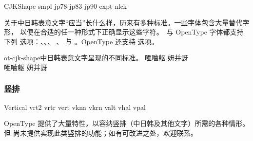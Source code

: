 \documentclass[a4paper]{l3doc}
\begin{document}
\begin{features}{CJKShape}
 {smpl}
    {jp78}
    {jp83}
    {jp90}
     {expt}
        {nlck}
\end{features}

关于中日韩表意文字“应当”长什么样，历来有多种标准。一些字体包含大量替代字形，
以便在合适的任一种形式下正确显示这些字符。\AAT\ 与 OpenType 字体都支持下列
 选项：、、、
、 与 。OpenType 还支持  选项。

\begin{Xexample}[firstline=2]{ot-cjk-shape}{中日韩表意文字呈现的不同标准。}
  \LARGE\def\text{\noindent 唖噛躯 妍并訝}
  {
  \text }                          \\
  {
  \text }                          
\end{Xexample}


\subsubsection{竖排}

\begin{features}{Vertical}
         {vrt2}
 {vrtr}
            {vert}
        {vkna}
               {vkrn}
      {valt}
           {vhal}
   {vpal}
\end{features}

OpenType 提供了大量特性，以容纳竖排（中日韩及其他文字）所需的各种情形。
但  尚未提供实现此类竖排的功能；如有可改进之处，欢迎联系。
\end{document}
